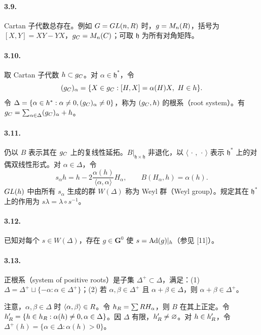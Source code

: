 \paragraph*{3.9.} Cartan 子代数总存在。例如 $G=GL(n,R)$ 时，$g=M_n(R)$，括号为 $[X,Y]=XY-YX$，$g_{C}=M_n(C)$；可取 $\mathfrak h$ 为所有对角矩阵。
\paragraph*{3.10.} 取 Cartan 子代数 $h\subset g_{C}$。对 $\alpha\in\mathfrak h^*$，令
\[
 (g_{C})_\alpha=\{X\in g_{C}:[H,X]=\alpha(H)X,\ H\in h\}.
\]
令 $\Delta=\{\alpha\in h^*:\alpha\ne0,(g_{C})_\alpha\ne0\}$，称为 $(g_{C},h)$ 的根系（root system）。有 $g_{C}=\sum_{\alpha\in\Delta}(g_{C})_\alpha+h$。
\paragraph*{3.11.} 仍以 $B$ 表示其在 $g_{C}$ 上的复线性延拓。$B|_{\mathfrak h\times\mathfrak h}$ 非退化，以 $\langle\,\cdot\,,\,\cdot\,\rangle$ 表示 $\mathfrak h^*$ 上的对偶双线性形式。对 $\alpha\in\Delta$，令
\[
 s_\alpha h=h-2\frac{\alpha(h)}{\langle\alpha,\alpha\rangle}H_\alpha,
 \qquad B(H_\alpha,h)=\alpha(h).
\]
$GL(h)$ 中由所有 $s_\alpha$ 生成的群 $W(\Delta)$ 称为 Weyl 群（Weyl group）。规定其在 $\mathfrak h^*$ 上的作用为 $s\lambda=\lambda\circ s^{-1}$。
\paragraph*{3.12.} 已知对每个 $s\in W(\Delta)$，存在 $g\in\mathbf G^0$ 使 $s=\operatorname{Ad}(g)|_{h}$（参见 [11]）。
\paragraph*{3.13.} 正根系（system of positive roots）是子集 $\Delta^+\subset\Delta$，满足：(1) $\Delta=\Delta^+\sqcup\{-\alpha:\alpha\in\Delta^+\}$；(2) 若 $\alpha,\beta\in\Delta^+$ 且 $\alpha+\beta\in\Delta$，则 $\alpha+\beta\in\Delta^+$。

注意，$\alpha,\beta\in\Delta$ 时 $\langle\alpha,\beta\rangle\in R$。令 $h_{R}=\sum R H_\alpha$，则 $B$ 在其上正定。令 $h'_{R}=\{h\in h_{R}:\alpha(h)\ne0,\alpha\in\Delta\}$。因 $\Delta$ 有限，$h'_{R}\ne\varnothing$。对 $h\in h'_{R}$，令 $\Delta^+(h)=\{\alpha\in\Delta:\alpha(h)>0\}$。
